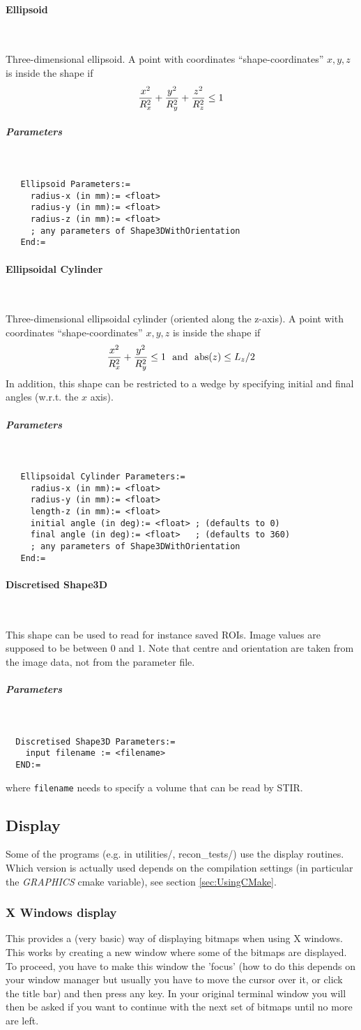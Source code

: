 \documentclass{article}
\newcommand{\subsubsubsection}[1]{\paragraph{#1}\mbox{} \\}
\newcommand{\subsubsubsubsection}[1]{\subparagraph{#1} \mbox{} \\}
\begin{document}
{{ \subsubsubsection{Ellipsoid}
}
Three-dimensional ellipsoid.
A point with coordinates ``shape-coordinates'' $x,y,z$ is inside the shape if
\[
  {x^2 \over R_x^2} + {y^2 \over R_y^2} + {z^2 \over R_z^2} \le 1
\]
{ \subsubsubsubsection{Parameters}
}
\begin{verbatim}
   Ellipsoid Parameters:=
     radius-x (in mm):= <float>
     radius-y (in mm):= <float>
     radius-z (in mm):= <float>
     ; any parameters of Shape3DWithOrientation
   End:=
\end{verbatim}

{ \subsubsubsection{Ellipsoidal Cylinder}
}
Three-dimensional ellipsoidal cylinder (oriented along the z-axis).
A point with coordinates ``shape-coordinates'' $x,y,z$ is inside the shape if
\[
  {x^2 \over R_x^2} + {y^2 \over R_y^2}  \le 1 \,\,\,\, \mathrm{and}  \,\,\,\,\mathrm{abs}(z) \le L_z/2
\]
In addition, this shape can be restricted to a wedge by specifying initial and final angles (w.r.t. the $x$ axis).
\subsubsubsubsection{Parameters}
\begin{verbatim}
   Ellipsoidal Cylinder Parameters:=
     radius-x (in mm):= <float>
     radius-y (in mm):= <float>
     length-z (in mm):= <float>
     initial angle (in deg):= <float> ; (defaults to 0)
     final angle (in deg):= <float>   ; (defaults to 360)
     ; any parameters of Shape3DWithOrientation
   End:=
\end{verbatim}

{ \subsubsubsection{Discretised Shape3D}
}
This shape can be used to read for instance saved ROIs. Image values are supposed to be between $0$ and $1$.
Note that centre and orientation are taken from the image data, not from the parameter file.
{ \subsubsubsubsection{Parameters}
}
\begin{verbatim}
  Discretised Shape3D Parameters:=
    input filename := <filename>
  END:=
\end{verbatim}
where \texttt{filename} needs to specify a volume that can be read by STIR.


\subsection{
Display}

Some of the programs (e.g. in utilities/, recon\_tests/) use 
the display routines. Which version is actually used depends 
on the compilation settings (in particular the \textit{GRAPHICS} cmake 
variable), see section \ref{sec:UsingCMake}. 


\subsubsection{
X Windows display}
\label{sec:display}
This provides a (very basic) way of displaying bitmaps when using 
X windows. This works by creating a new window where some of 
the bitmaps are displayed. To proceed, you have to make this 
window the 'focus' (how to do this depends on your window manager 
but usually you have to move the cursor over it, or click the 
title bar) and then press any key. In your original terminal 
window you will then be asked if you want to continue with the 
next set of bitmaps until no more are left.


}
\end{document}
